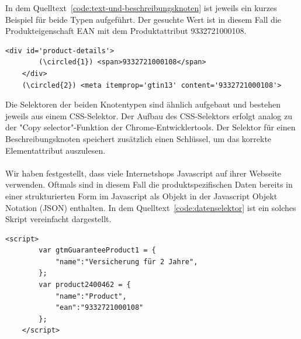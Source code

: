 In dem Quelltext~\ref{code:text-und-beschreibungsknoten} ist jeweils ein kurzes Beispiel für beide Typen aufgeführt.
Der gesuchte Wert ist in diesem Fall die Produkteigenschaft EAN mit dem Produktattribut 9332721000108.
\vspace{0.25cm}
\begin{lstlisting}[label={code:text-und-beschreibungsknoten}]
    <div id='product-details'>
        (\circled{1}) <span>9332721000108</span>
    </div>
    (\circled{2}) <meta itemprop='gtin13' content='9332721000108'>
\end{lstlisting}
\vspace{-0.25cm}
\vspace{0.25cm}
Die Selektoren der beiden Knotentypen sind ähnlich aufgebaut und bestehen jeweils aus einem CSS-Selektor.
Der Aufbau des CSS-Selektors erfolgt analog zu der "Copy selector"-Funktion der Chrome-Entwicklertools.
Der Selektor für einen Beschreibungsknoten speichert zusätzlich einen Schlüssel, um das korrekte Elementattribut
auszulesen.
\\
\\
Wir haben festgestellt, dass viele Internetshops Javascript auf ihrer Webseite verwenden.
Oftmals sind in diesem Fall die produktspezifischen Daten bereits in einer strukturierten Form im Javascript
als Objekt in der Javascript Objekt Notation (JSON) enthalten.
In dem Quelltext~\ref{code:datenselektor} ist ein solches Skript vereinfacht dargestellt.
\vspace{0.25cm}
\begin{lstlisting}[label={code:datenselektor}]
    <script>
        var gtmGuaranteeProduct1 = {
            "name":"Versicherung für 2 Jahre",
        };
        var product2400462 = {
            "name":"Product",
            "ean":"9332721000108"
        };
    </script>
\end{lstlisting}
\vspace{-0.25cm}
\vspace{0.25cm}


